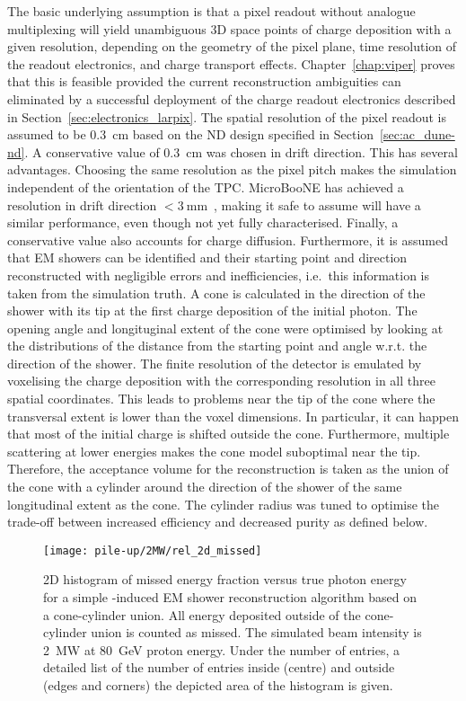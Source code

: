 The basic underlying assumption is that a pixel readout without analogue multiplexing will yield unambiguous 3D space points of charge deposition with a given resolution, depending on the geometry of the pixel plane, time resolution of the readout electronics, and charge transport effects.
Chapter~\ref{chap:viper} proves that this is feasible provided the current reconstruction ambiguities can eliminated by a successful deployment of the \larpix{} charge readout electronics described in Section~\ref{sec:electronics_larpix}.
The spatial resolution of the pixel readout is assumed to be \SI{0.3}{\centi\metre} based on the ND design specified in Section~\ref{sec:ac_dune-nd}.
A conservative value of \SI{0.3}{\centi\meter} was chosen in drift direction.
This has several advantages.
Choosing the same resolution as the pixel pitch makes the simulation independent of the orientation of the TPC.
MicroBooNE has achieved a resolution in drift direction $< \SI{3}{\milli\metre}$~\cite{uboone}, making it safe to assume \larpix{} will have a similar performance, even though not yet fully characterised.
Finally, a conservative value also accounts for charge diffusion.
Furthermore, it is assumed that EM showers can be identified and their starting point and direction reconstructed with negligible errors and inefficiencies, i.e.\ this information is taken from the simulation truth.
A cone is calculated in the direction of the shower with its tip at the first charge deposition of the initial photon.
The opening angle and longituginal extent of the cone were optimised by looking at the distributions of the distance from the starting point and angle w.r.t. the direction of the shower.
The finite resolution of the detector is emulated by voxelising the charge deposition with the corresponding resolution in all three spatial coordinates.
This leads to problems near the tip of the cone where the transversal extent is lower than the voxel dimensions.
In particular, it can happen that most of the initial charge is shifted outside the cone.
Furthermore, multiple scattering at lower energies makes the cone model suboptimal near the tip.
Therefore, the acceptance volume for the reconstruction is taken as the union of the cone with a cylinder around the direction of the shower of the same longitudinal extent as the cone.
The cylinder radius was tuned to optimise the trade-off between increased efficiency and decreased purity as defined below.

\begin{figure}[htb]
	\centering
	\texttt{[image: pile-up/2MW/rel\_2d\_missed]}
	\caption{2D histogram of missed energy fraction versus true photon energy for a simple \Pgpz-induced EM shower reconstruction algorithm based on a cone-cylinder union.
		All energy deposited outside of the cone-cylinder union is counted as missed.
		The simulated beam intensity is \SI{2}{\mega\watt} at \SI{80}{\giga\electronvolt} proton energy.
		Under the number of entries, a detailed list of the number of entries inside (centre) and outside (edges and corners) the depicted area of the histogram is given.}
	\label{fig:dune-nd_2MW_rel-2d-missed}
\end{figure}


